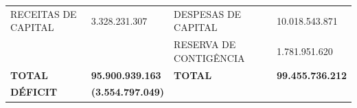 \documentclass{article}
\begin{document}
\begin{longtable}[c]{m{4cm}|m{2cm}|m{4cm}|m{2cm}}
\multicolumn{1}{L{6cm}}{RECEITAS DE CAPITAL} & \multicolumn{1}{R{3cm}}{3.328.231.307} & \multicolumn{1}{L{6cm}}{ \hspace{1cm} DESPESAS DE CAPITAL} & \multicolumn{1}{R{2.5cm}}{10.018.543.871} \\
\multicolumn{1}{L{6cm}}{} & \multicolumn{1}{R{3cm}}{} & \multicolumn{1}{L{6cm}}{ \hspace{1cm} RESERVA DE CONTIGÊNCIA} & \multicolumn{1}{R{2.5cm}}{1.781.951.620} \\
\multicolumn{1}{L{6cm}}{ \textbf{TOTAL}} & \multicolumn{1}{R{3cm}}{ \textbf{95.900.939.163}} & \multicolumn{1}{L{6cm}}{ \textbf{ \hspace{1cm}TOTAL}} & \multicolumn{1}{R{2.5cm}}{ \textbf{99.455.736.212}} \\
\multicolumn{1}{L{6cm}}{ \textbf{DÉFICIT}} & \multicolumn{1}{R{3cm}}{ \textbf{(3.554.797.049)}} & \multicolumn{1}{L{6cm}}{ \textbf{ \hspace{1cm}}} & \multicolumn{1}{R{2.5cm}}{ \textbf{}} \\\hline\hline\hline\hline\end{longtable}\raggedright\fontsize{7pt}{10pt}\selectfont {FONTE: Armazém SISOR.}\\\fontsize{7pt}{10pt}\selectfont {ELABORAÇÃO: DCAF/SCPPO/SEPLAG}\\\fontsize{7pt}{10pt}\selectfont {NOTA: Com intuito de evitar a dupla contagem na elaboração desse relatório, foram desconsiderados os valores referentes às operações intra-orçamentárias.}\\
\end{document}
